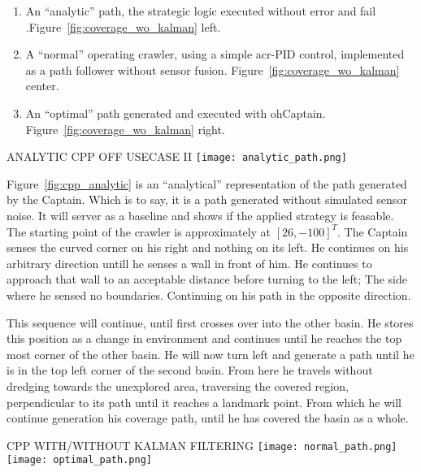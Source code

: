 \begin{enumerate}
    \item An ``analytic'' path, the strategic logic executed without error and fail
    .Figure~\ref{fig:coverage_wo_kalman} left.
    \item A ``normal'' operating crawler, using a simple \gls{acr-PID} control, implemented as a path follower without
    sensor fusion. Figure~\ref{fig:coverage_wo_kalman} center.
    \item An ``optimal'' path generated and executed with ohCaptain. Figure~\ref{fig:coverage_wo_kalman} right.
\end{enumerate}

\begin{RoyalFigure}[htb, label=fig:cpp_analytic]{ANALYTIC CPP OFF USECASE II}
    \texttt{[image: analytic\_path.png]}
\end{RoyalFigure}

Figure~\ref{fig:cpp_analytic} is an ``analytical'' representation of the path generated by the Captain. Which is to 
say, it is a path generated without simulated sensor noise. It will server as a baseline and shows if the applied 
strategy is feasable. The starting point of the crawler is approximately at \( [26, -100]^T \). The Captain senses 
the curved corner on his right and nothing on its left. He continues on his arbitrary direction untill he senses a 
wall in front of him. He continues to approach that wall to an acceptable distance before turning to the left; The 
side where he sensed no boundaries. Continuing on his path in the opposite direction.

This sequence will continue, until first crosses over into the other basin. He stores this position as a change in 
environment and continues until he reaches the top most corner of the other basin. He will now turn left and generate 
a path until he is in the top left corner of the second basin. From here he travels without dredging towards the 
unexplored area, traversing the covered region, perpendicular to its path until it reaches a landmark point. From 
which he will continue generation his coverage path, until he has covered the basin as a whole.

\begin{RoyalFigure}[htb, label=fig:coverage_wo_kalman]{CPP WITH/WITHOUT KALMAN FILTERING}
    \texttt{[image: normal\_path.png]}
    \texttt{[image: optimal\_path.png]}
\end{RoyalFigure}

